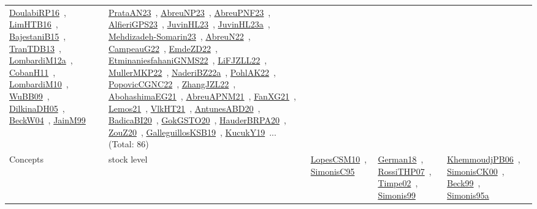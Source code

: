 {\begin{longtable}{lp{3cm}>{\raggedright\arraybackslash}p{6cm}>{\raggedright\arraybackslash}p{6cm}>{\raggedright\arraybackslash}p{8cm}}
\href{../works/DoulabiRP16.pdf}{DoulabiRP16}~\cite{DoulabiRP16}, \href{../works/LimHTB16.pdf}{LimHTB16}~\cite{LimHTB16}, \href{../works/BajestaniB15.pdf}{BajestaniB15}~\cite{BajestaniB15}, \href{../works/TranTDB13.pdf}{TranTDB13}~\cite{TranTDB13}, \href{../works/LombardiM12a.pdf}{LombardiM12a}~\cite{LombardiM12a}, \href{../works/CobanH11.pdf}{CobanH11}~\cite{CobanH11}, \href{../works/LombardiM10.pdf}{LombardiM10}~\cite{LombardiM10}, \href{../works/WuBB09.pdf}{WuBB09}~\cite{WuBB09}, \href{../works/DilkinaDH05.pdf}{DilkinaDH05}~\cite{DilkinaDH05}, \href{../works/BeckW04.pdf}{BeckW04}~\cite{BeckW04}, \href{../works/JainM99.pdf}{JainM99}~\cite{JainM99} & \href{../works/PrataAN23.pdf}{PrataAN23}~\cite{PrataAN23}, \href{../works/AbreuNP23.pdf}{AbreuNP23}~\cite{AbreuNP23}, \href{../works/AbreuPNF23.pdf}{AbreuPNF23}~\cite{AbreuPNF23}, \href{../works/AlfieriGPS23.pdf}{AlfieriGPS23}~\cite{AlfieriGPS23}, \href{../works/JuvinHL23.pdf}{JuvinHL23}~\cite{JuvinHL23}, \href{../works/JuvinHL23a.pdf}{JuvinHL23a}~\cite{JuvinHL23a}, \href{../works/Mehdizadeh-Somarin23.pdf}{Mehdizadeh-Somarin23}~\cite{Mehdizadeh-Somarin23}, \href{../works/AbreuN22.pdf}{AbreuN22}~\cite{AbreuN22}, \href{../works/CampeauG22.pdf}{CampeauG22}~\cite{CampeauG22}, \href{../works/EmdeZD22.pdf}{EmdeZD22}~\cite{EmdeZD22}, \href{../works/EtminaniesfahaniGNMS22.pdf}{EtminaniesfahaniGNMS22}~\cite{EtminaniesfahaniGNMS22}, \href{../works/LiFJZLL22.pdf}{LiFJZLL22}~\cite{LiFJZLL22}, \href{../works/MullerMKP22.pdf}{MullerMKP22}~\cite{MullerMKP22}, \href{../works/NaderiBZ22a.pdf}{NaderiBZ22a}~\cite{NaderiBZ22a}, \href{../works/PohlAK22.pdf}{PohlAK22}~\cite{PohlAK22}, \href{../works/PopovicCGNC22.pdf}{PopovicCGNC22}~\cite{PopovicCGNC22}, \href{../works/ZhangJZL22.pdf}{ZhangJZL22}~\cite{ZhangJZL22}, \href{../works/AbohashimaEG21.pdf}{AbohashimaEG21}~\cite{AbohashimaEG21}, \href{../works/AbreuAPNM21.pdf}{AbreuAPNM21}~\cite{AbreuAPNM21}, \href{../works/FanXG21.pdf}{FanXG21}~\cite{FanXG21}, \href{../works/Lemos21.pdf}{Lemos21}~\cite{Lemos21}, \href{../works/VlkHT21.pdf}{VlkHT21}~\cite{VlkHT21}, \href{../works/AntunesABD20.pdf}{AntunesABD20}~\cite{AntunesABD20}, \href{../works/BadicaBI20.pdf}{BadicaBI20}~\cite{BadicaBI20}, \href{../works/GokGSTO20.pdf}{GokGSTO20}~\cite{GokGSTO20}, \href{../works/HauderBRPA20.pdf}{HauderBRPA20}~\cite{HauderBRPA20}, \href{../works/ZouZ20.pdf}{ZouZ20}~\cite{ZouZ20}, \href{../works/GalleguillosKSB19.pdf}{GalleguillosKSB19}~\cite{GalleguillosKSB19}, \href{../works/KucukY19.pdf}{KucukY19}~\cite{KucukY19}... (Total: 86)\\
Concepts & stock level & \href{../works/LopesCSM10.pdf}{LopesCSM10}~\cite{LopesCSM10}, \href{../works/SimonisC95.pdf}{SimonisC95}~\cite{SimonisC95} & \href{../works/German18.pdf}{German18}~\cite{German18}, \href{../works/RossiTHP07.pdf}{RossiTHP07}~\cite{RossiTHP07}, \href{../works/Timpe02.pdf}{Timpe02}~\cite{Timpe02}, \href{../works/Simonis99.pdf}{Simonis99}~\cite{Simonis99} & \href{../works/KhemmoudjPB06.pdf}{KhemmoudjPB06}~\cite{KhemmoudjPB06}, \href{../works/SimonisCK00.pdf}{SimonisCK00}~\cite{SimonisCK00}, \href{../works/Beck99.pdf}{Beck99}~\cite{Beck99}, \href{../works/Simonis95a.pdf}{Simonis95a}~\cite{Simonis95a}\\

\end{longtable}}
